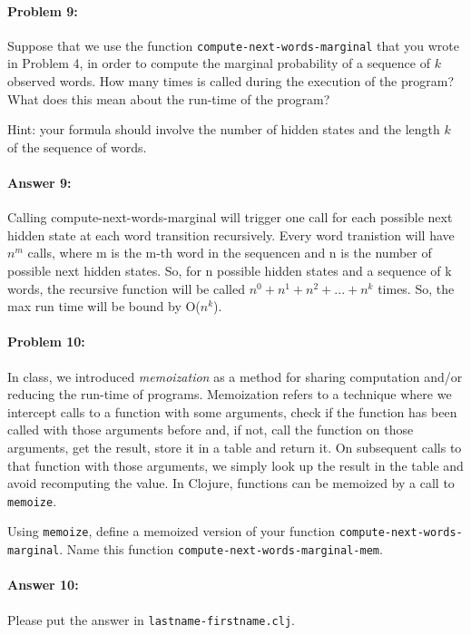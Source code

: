 \documentclass[10pt]{article}
\begin{document}
\hrulefill
\paragraph{Problem 9:}
Suppose that we use the function \texttt{compute-next-words-marginal}
that you wrote in Problem 4, in order to compute the marginal
probability of a sequence of $k$ observed words. How many times is
 called during the execution of the
program? What does this mean about the run-time of the program?

\noindent Hint: your formula should involve the number of hidden
states and the length $k$ of the sequence of words.

\paragraph{Answer 9:} Calling compute-next-words-marginal will trigger one call for each possible next hidden state at each word transition recursively. Every word tranistion will have $n^m$ calls, where m is the m-th word in the sequencen and n is the number of possible next hidden states. So, for n possible hidden states and a sequence of k words, the recursive function will be called $n^0 + n^	1 + n^2 + ... + n^k$ times. So, the max run time will be bound by O($n^k$).

\hrulefill
\paragraph{Problem 10:}
In class, we introduced \emph{memoization} as a method for sharing
computation and/or reducing the run-time of programs. Memoization
refers to a technique where we intercept calls to a function with some
arguments, check if the function has been called with those arguments
before and, if not, call the function on those arguments, get the
result, store it in a table and return it. On subsequent calls to that
function with those arguments, we simply look up the result in the
table and avoid recomputing the value. In Clojure, functions can be
memoized by a call to \texttt{memoize}.

Using \texttt{memoize}, define a memoized version of your function
\texttt{compute-next-words-marginal}. Name this function
\texttt{compute-next-words-marginal-mem}.


\paragraph{Answer 10:} Please put the answer in
\texttt{lastname-firstname.clj}.
\end{document}
